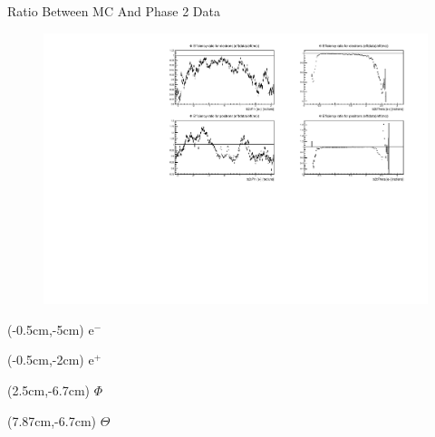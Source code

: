 \documentclass[10pt]{beamer}
\begin{document}
\begin{frame}{Ratio Between MC And Phase 2 Data}
	
	
	
	\begin{figure} 
	
	
	\centering
	\includegraphics[width=\textwidth]{Plots/Eff/Ratio}
\end{figure}
		\begin{textblock*}{0.3\textwidth}(-0.5cm,-5cm)
		$\textrm{e}^-$
	\end{textblock*}
	\begin{textblock*}{0.3\textwidth}(-0.5cm,-2cm)
		$\textrm{e}^+$
	\end{textblock*}
	
	
	\begin{textblock*}{0.3\textwidth}(2.5cm,-6.7cm)
		$\Phi$
	\end{textblock*}
	
	
	\begin{textblock*}{0.3\textwidth}(7.87cm,-6.7cm)
		$\Theta$
	\end{textblock*}
	
	
	
\end{frame}
\end{document}
